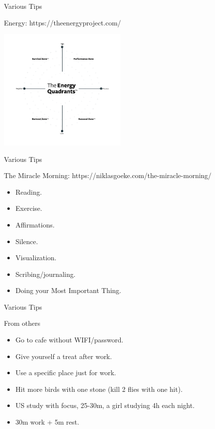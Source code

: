 \begin{frame}{Various Tips}
  \begin{block}{Energy: https://theenergyproject.com/}
    \begin{center}
      \includegraphics[height=6cm]{img/the-energy-project.png}
    \end{center}
  \end{block}
\end{frame}

\begin{frame}{Various Tips}
  \begin{block}{The Miracle Morning: https://niklasgoeke.com/the-miracle-morning/}
    \begin{itemize}
      \item Reading.
      \item Exercise.
      \item Affirmations.
      \item Silence.
      \item Visualization.
      \item Scribing/journaling.
      \item Doing your Most Important Thing.
    \end{itemize}
  \end{block}
\end{frame}

\begin{frame}{Various Tips}
  \begin{block}{From others}
    \begin{itemize}
      \item Go to cafe without WIFI/password.
      \item Give yourself a treat after work.
      \item Use a specific place just for work.
      \item Hit more birds with one stone (kill 2 flies with one hit).
      \item US study with focus, 25-30m, a girl studying 4h each night.
      \item 30m work + 5m rest.
    \end{itemize}
  \end{block}
\end{frame}

